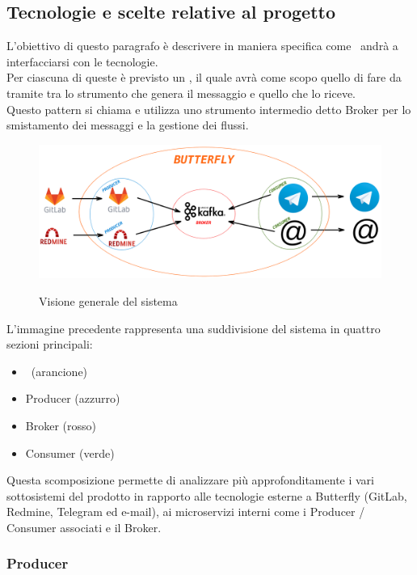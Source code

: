 \subsection{Tecnologie e scelte relative al progetto}
	L'obiettivo di questo paragrafo è descrivere in maniera specifica come \progetto\ andrà a interfacciarsi con le tecnologie.\\
	Per ciascuna di queste è previsto un , il quale avrà come scopo quello di fare da tramite tra lo strumento che genera il messaggio e quello che lo riceve.\\
	Questo pattern si chiama  e utilizza uno strumento intermedio detto Broker per lo smistamento dei messaggi e la gestione dei flussi.

	\begin{figure}[H]
		\centering
		\includegraphics[width=\textwidth]{img/butterfly.png}\\
		\caption{Visione generale del sistema \progetto}
		\label{fig:butterfly}
	\end{figure}
	L'immagine precedente rappresenta una suddivisione del sistema in quattro sezioni principali:
	\begin{itemize}
		\item \progetto\ (arancione)
		\item Producer (azzurro)
		\item Broker (rosso)
		\item Consumer (verde)
	\end{itemize}
	Questa scomposizione permette di analizzare più approfonditamente i vari sottosistemi del prodotto in rapporto alle tecnologie esterne a Butterfly (GitLab, Redmine, Telegram ed e-mail), ai microservizi interni come i Producer / Consumer associati e il Broker.
	
	\subsubsection{Producer}
	
